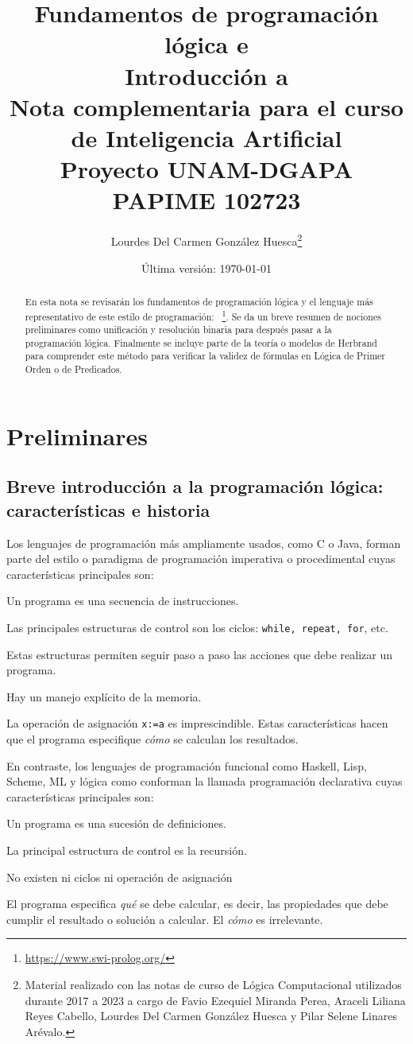 \documentclass[11pt,letterpaper]{article}
\title{Fundamentos de programación lógica e \\ Introducci\'on a {\pl}\\
\Large{Nota complementaria para el curso de Inteligencia Artificial\\
Proyecto UNAM-DGAPA PAPIME 102723}}
\author{Lourdes Del Carmen Gonz\'alez Huesca\thanks{Material 
realizado con las notas de curso de L\'ogica Computacional utilizados durante 
2017 a 2023 a cargo de Favio Ezequiel Miranda Perea, Araceli Liliana Reyes Cabello, 
Lourdes Del Carmen Gonz\'alez Huesca y Pilar Selene Linares Arévalo.}}
\date{\'Ultima versi\'on: \today}
\begin{document}
\maketitle

\vspace*{-20pt}

\begin{abstract}
En esta nota se revisar\'an los fundamentos de programaci\'on l\'ogica y el 
lenguaje m\'as representativo de este estilo de programaci\'on: {\pl}~\footnote{\url{https://www.swi-prolog.org/}}.
Se da un breve resumen de nociones preliminares como unificaci\'on y resoluci\'on binaria para despu\'es pasar a la programaci\'on l\'ogica. 
Finalmente se incluye parte de la teor\'ia o modelos de Herbrand para comprender este m\'etodo para verificar la validez de f\'ormulas en L\'ogica de Primer Orden o de Predicados.
\end{abstract}

\section{Preliminares}


\subsection{Breve introducción a la programación lógica: características e historia}

Los lenguajes de programación más ampliamente usados, como {\sc C} o 
{\sc Java}, forman parte del estilo o paradigma de programación imperativa o 
procedimental cuyas características principales son:
\bi
 \item Un programa es una secuencia de instrucciones.
 \item Las principales estructuras de control son los ciclos:
  \texttt{while, repeat, for}, etc.
  \item Estas estructuras permiten seguir paso a paso las
   acciones que debe realizar un programa.
 \item Hay un manejo expl\'icito de la memoria.
 \item La operación de asignación \texttt{x:=a} es imprescindible.
\ei
Estas caracter\'isticas hacen que el programa especifique \emph{cómo} se calculan los resultados.
\smallskip

En contraste, los lenguajes de programación funcional como {\sc Haskell, Lisp, 
Scheme, ML} y lógica como {\pl} conforman la llamada programación 
declarativa cuyas características principales son:
\bi
 \item Un programa es una sucesión de definiciones.
 \item La principal estructura de control es la recursión.
 \item No existen ni ciclos ni operación de asignación 
 \item El programa especifica \emph{qu\'e} se debe calcular, es decir, las
  propiedades que debe cumplir el resultado o solución a calcular. El \emph{c\'omo} es irrelevante.
\ei
\end{document}
